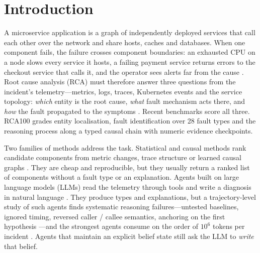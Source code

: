 \section{Introduction}\label{sec:intro}

A microservice application is a graph of independently deployed services that call each other over the network and share
hosts, caches and databases. When one component fails, the failure crosses component boundaries: an exhausted CPU on a node slows
every service it hosts, a failing payment service returns errors to the checkout service that calls it, and the operator sees
alerts far from the cause \citep{avizienis2004taxonomy,soldani2022anomaly}. Root cause analysis (RCA) must therefore answer three
questions from the incident's telemetry---metrics, logs, traces, Kubernetes events and the service topology: \emph{which} entity is
the root cause, \emph{what} fault mechanism acts there, and \emph{how} the fault propagated to the symptoms
\citep{zhang2025survey,fu2025survey}. Recent benchmarks score all three. RCA100 \citep{cai2026benchmark} grades entity localisation,
fault identification over 28 fault types and the reasoning process along a typed causal chain with numeric evidence checkpoints.

Two families of methods address the task. Statistical and causal methods rank candidate components from metric changes, trace
structure or learned causal graphs \citep{wu2020microrca,ikram2022rcd,pham2024baro,li2022circa,yu2023nezha,zheng2024mulan}. They are
cheap and reproducible, but they usually return a ranked list of components without a fault type or an explanation. Agents built on
large language models (LLMs) read the telemetry through tools and write a diagnosis in natural language
\citep{chen2024rcacopilot,wang2024rcagent,xu2025openrca,pei2025flowofaction,zhang2024mabc}. They produce types and explanations,
but a trajectory-level study of such agents finds systematic reasoning failures---untested baselines, ignored timing, reversed
caller / callee semantics, anchoring on the first hypothesis \citep{lu2026beyond,riddell2026stalled}---and the strongest agents
consume on the order of $10^6$ tokens per incident \citep{lu2026beyond,luo2026pos}. Agents that maintain an explicit belief state
\citep{luo2026pos,luo2026graphofstates} still ask the LLM to \emph{write} that belief.

